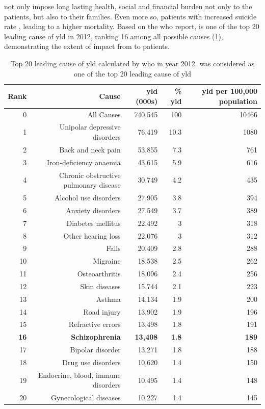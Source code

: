 \documentclass{book}
\newcommand*{\glng}{\glsentrylong}
\newcommand*{\Glng}{\Glsentrylong}
\begin{document}
	\Glng{scz} not only impose long lasting health, social and financial burden not only to the patients, but also to their families\citep{Knapp2004}. 
	Even more so, patients with \glng{scz} increased suicide rate \citep{Saha2007}, leading to a higher mortality.
	Based on the \gls{who} report, \glng{scz} is one of the top 20 leading cause of \gls{yld} in 2012, ranking 16 among all possible causes (\cref{tab:whoYLD}), demonstrating the extent of impact from \glng{scz} to patients.
	\begin{table}
		\centering
		\caption[Top 20 leading cause of \glng{yld} calculated by  in year 2012]{Top 20 leading cause of \gls{yld} calculated by \gls{who} in year 2012.
			\Glng{scz} was considered as one of the top 20 leading cause of \gls{yld}\citep{Geneva2013}}
		\begin{tabular}{rrrrr}
			\toprule
			Rank  & Cause & \gls{yld} (000s) & \% \gls{yld} & \gls{yld} per 100,000 population \\
			\midrule
			0     & All Causes & 740,545 & 100   & 10466 \\
			1     & Unipolar depressive disorders & 76,419 & 10.3  & 1080 \\
			2     & Back and neck pain & 53,855 & 7.3   & 761 \\
			3     & Iron-deficiency anaemia & 43,615 & 5.9   & 616 \\
			4     & Chronic obstructive pulmonary disease & 30,749 & 4.2   & 435 \\
			5     & Alcohol use disorders & 27,905 & 3.8   & 394 \\
			6     & Anxiety disorders & 27,549 & 3.7   & 389 \\
			7     & Diabetes mellitus & 22,492 & 3     & 318 \\
			8     & Other hearing loss & 22,076 & 3     & 312 \\
			9     & Falls & 20,409 & 2.8   & 288 \\
			10    & Migraine & 18,538 & 2.5   & 262 \\
			11    & Osteoarthritis & 18,096 & 2.4   & 256 \\
			12    & Skin diseases & 15,744 & 2.1   & 223 \\
			13    & Asthma & 14,134 & 1.9   & 200 \\
			14    & Road injury & 13,902 & 1.9   & 196 \\
			15    & Refractive errors & 13,498 & 1.8   & 191 \\
			\textbf{16}    & \textbf{Schizophrenia} & \textbf{13,408} & \textbf{1.8}   & \textbf{189} \\
			17    & Bipolar disorder & 13,271 & 1.8   & 188 \\
			18    & Drug use disorders & 10,620 & 1.4   & 150 \\
			19    & Endocrine, blood, immune disorders & 10,495 & 1.4   & 148 \\
			20    & Gynecological diseases & 10,227 & 1.4   & 145 \\
			\bottomrule
		\end{tabular}%
		\label{tab:whoYLD}%
	\end{table}%
	
\end{document}

